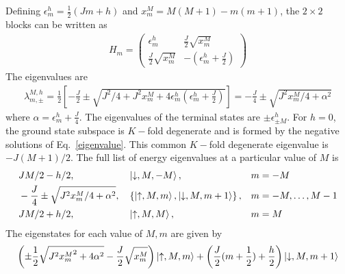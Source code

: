 \documentclass[12pt]{revtex4-2}
\begin{document}
Defining \(\epsilon^h_m = \frac{1}{2}\left(Jm + h\right) \) and \(x^M_m = M(M+1) - m(m+1)\), the \(2\times 2\) blocks can be written as
\begin{align}
	H_m = \begin{pmatrix} \epsilon^h_m & \frac{J}{2}\sqrt{x^M_m} \\ \frac{J}{2}\sqrt{x^M_m} & -\left( \epsilon^h_m + \frac{J}{2} \right)   \end{pmatrix} 
\end{align}
The eigenvalues are 
\begin{align}
	\label{eigenvalue}
	\lambda_{m, \pm}^{M, h} = \frac{1}{2}\left[-\frac{J}{2} \pm \sqrt{J^2/4 + J^2 x_m^M + 4\epsilon^h_m\left(\epsilon^h_m + \frac{J}{2}\right) }\right] = -\frac{J}{4} \pm \sqrt{J^2x^M_m/4 + \alpha^2}
\end{align}
where \(\alpha = \epsilon^h_m + \frac{J}{4}\).
The eigenvalues of the terminal states are \(\pm\epsilon^h_{\pm M}\). For \(h = 0\), the ground state subspace is \(K-\)fold degenerate and is formed by the negative solutions of Eq.~\ref{eigenvalue}. This common \(K-\)fold degenerate eigenvalue is \(-J(M+1)/2\).
The full list of energy eigenvalues at a particular value of \(M\) is
\begin{align}
\label{stargraph_spectrum}
&		JM/2 - h/2, &&\ket{\downarrow, M, -M}, && m = -M\\
&-\frac{J}{4} \pm \sqrt{J^2x^M_m/4 + \alpha^2}, &&\left\{\ket{\uparrow, M, m}, \ket{\downarrow, M, m+1}\right\}, &&m=-M,\ldots,M-1\\
&JM/2 + h/2, &&\ket{\uparrow, M, M},&& m = M\\
\end{align}
The eigenstates for each value of \(M,m\) are given by
\begin{align}
	\left(\pm\frac{1}{2}\sqrt{J^2 {x_m^M}^2 + 4\alpha^2} - \frac{J}{2}\sqrt{x_m^M}\right)\ket{\uparrow, M, m} + \left(\frac{J}{2}(m+\frac{1}{2}) + \frac{h}{2}\right) \ket{\downarrow, M, m+1}
\end{align}
\end{document}
